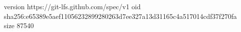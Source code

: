 version https://git-lfs.github.com/spec/v1
oid sha256:e65389e5aef11056232899280263d7ee327a13d31165c4a517014cdf37f270fa
size 87540
